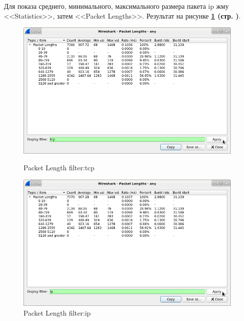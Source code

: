 Для показа среднего, минимального, максимального размера пакета ip
жму <<Statistics>>, затем <<Packet Lengths>>.
Результат на рисунке \textbf{\ref{fig:4-2-Packet-Length-filter-ip} (стр. \pageref{fig:4-2-Packet-Length-filter-ip})}.

\begin{figure}[!htp]
    \centering
    \begin{minipage}{.49\textwidth}
        \centering
        \includegraphics[width=.99\textwidth]
        {../_INCLUDES/main/task4/4-2-Packet-Length-filter-tcp.png}
        \caption{Packet Length filter:tcp}
        \label{fig:4-2-Packet-Length-filter-tcp}
    \end{minipage}
    \begin{minipage}{.49\textwidth}
        \centering
        \includegraphics[width=.99\textwidth]
        {../_INCLUDES/main/task4/4-2-Packet-Length-filter-ip.png}
        \caption{Packet Length filter:ip}
        \label{fig:4-2-Packet-Length-filter-ip}
    \end{minipage}
\end{figure}


